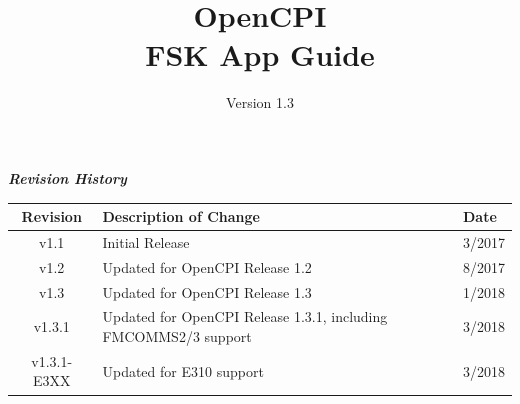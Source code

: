 \def\docTitle{OpenCPI\\ FSK App Guide}
\def\docVersion{1.3}

\date{Version \docVersion} %
\title{\docTitle}
\usepackage{graphicx}
\graphicspath{ {figures/} }
\usepackage{textcomp}


\maketitle
\newpage
	\begin{center}
	\textit{\textbf{Revision History}}
		\begin{table}[H]
		\label{table:revisions} %
			\begin{tabularx}{\textwidth}{|c|X|l|}
			\hline
			\rowcolor{blue}
			\textbf{Revision} & \textbf{Description of Change} & \textbf{Date} \\
		    \hline
		    v1.1 & Initial Release & 3/2017 \\
		    \hline
		    v1.2 & Updated for OpenCPI Release 1.2 & 8/2017 \\
			\hline
			v1.3 & Updated for OpenCPI Release 1.3 & 1/2018 \\
			\hline
			v1.3.1 & Updated for OpenCPI Release 1.3.1, including FMCOMMS2/3 support & 3/2018 \\
			\hline
			v1.3.1-E3XX & Updated for E310 support & 3/2018 \\
			\hline
			\end{tabularx}
		\end{table}
	\end{center}

